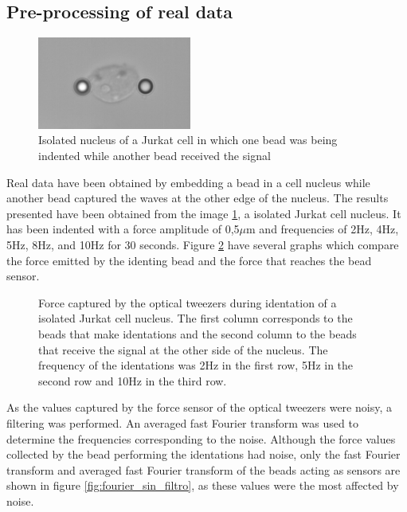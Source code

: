 \documentclass[12pt, a4paper]{article} %
\begin{document}
\subsection{Pre-processing of real data}

\begin{figure}
    \centering
    \includegraphics[width=0.45\textwidth]{figures/recorte_nucleo.png}
    \caption{Isolated nucleus of a Jurkat cell in which one bead was being indented while another bead received the signal}
    \label{fig:myfig3}
\end{figure}

Real data have been obtained by embedding a bead in a cell nucleus while another bead captured the waves at the other edge of the nucleus. The results presented have been obtained from the image \ref{fig:myfig3}, a isolated Jurkat cell nucleus. It has been indented with a force amplitude of 0,5$\mu$m and frequencies of 2Hz, 4Hz, 5Hz, 8Hz, and 10Hz for 30 seconds. Figure \ref{fig:raw_data} have several graphs which compare the force emitted by the identing bead and the force that reaches the bead sensor. \\

\setlength{\parskip}{4mm}

\begin{figure}[htbp]
  \centering
  
  \caption{Force captured by the optical tweezers during identation of a isolated Jurkat cell nucleus. The first column corresponds to the beads that make identations and the second column to the beads that receive the signal at the other side of the nucleus. The frequency of the identations was 2Hz in the first row, 5Hz in the second row and 10Hz in the third row.}
  \label{fig:raw_data}
\end{figure}

As the values captured by the force sensor of the optical tweezers were noisy, a filtering was performed. An averaged fast Fourier transform was used to determine the frequencies corresponding to the noise. Although the force values collected by the bead performing the identations had noise, only the fast Fourier transform and averaged fast Fourier transform of the beads acting as sensors are shown in figure \ref{fig:fourier_sin_filtro}, as these values were the most affected by noise. 
\end{document}
